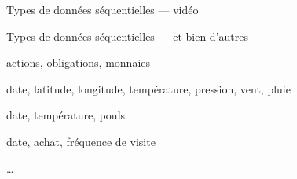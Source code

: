 \begin{frame}{Types de données séquentielles --- vidéo}
\end{frame}

\begin{frame}{Types de données séquentielles --- et bien d'autres}
  \begin{description}[<+->]
  \item[Economie] actions, obligations, monnaies
  \item[Météo] date, latitude, longitude, température, pression, vent, pluie
  \item[Santé] date, température, pouls
  \item[Comportements Clients] date, achat, fréquence de visite
  \item …
  \end{description}
\end{frame}
